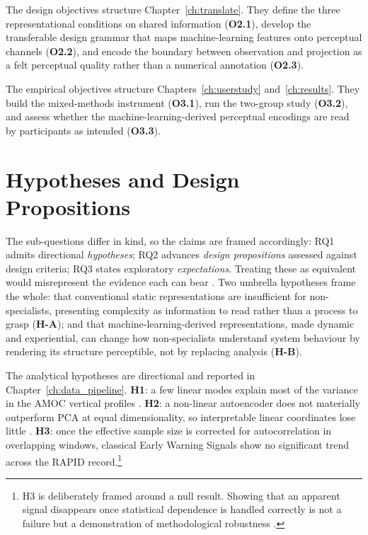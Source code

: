 The design objectives structure Chapter~\ref{ch:translate}. They define the three representational conditions on shared information (\textbf{O2.1}), develop the transferable design grammar that maps machine-learning features onto perceptual channels (\textbf{O2.2}), and encode the boundary between observation and projection as a felt perceptual quality rather than a numerical annotation (\textbf{O2.3}).

The empirical objectives structure Chapters~\ref{ch:userstudy} and~\ref{ch:results}. They build the mixed-methods instrument (\textbf{O3.1}), run the two-group study (\textbf{O3.2}), and assess whether the machine-learning-derived perceptual encodings are read by participants as intended (\textbf{O3.3}).

\section{Hypotheses and Design Propositions}
\label{sec:hypotheses}

The sub-questions differ in kind, so the claims are framed accordingly: RQ1 admits directional \emph{hypotheses}; RQ2 advances \emph{design propositions} assessed against design criteria; RQ3 states exploratory \emph{expectations}. Treating these as equivalent would misrepresent the evidence each can bear \citep{cronbach1975, mckenney2018}. Two umbrella hypotheses frame the whole: that conventional static representations are insufficient for non-specialists, presenting complexity as information to read rather than a process to grasp (\textbf{H-A}); and that machine-learning-derived representations, made dynamic and experiential, can change how non-specialists understand system behaviour by rendering its structure perceptible, not by replacing analysis (\textbf{H-B}).

The analytical hypotheses are directional and reported in Chapter~\ref{ch:data_pipeline}. \textbf{H1}: a few linear modes explain most of the variance in the AMOC vertical profiles \citep{buckley2016, hannachi2007}. \textbf{H2}: a non-linear autoencoder does not materially outperform PCA at equal dimensionality, so interpretable linear coordinates lose little \citep{baldi1989}. \textbf{H3}: once the effective sample size is corrected for autocorrelation in overlapping windows, classical Early Warning Signals show no significant trend across the RAPID record.\footnote{H3 is deliberately framed around a null result. Showing that an apparent signal disappears once statistical dependence is handled correctly is not a failure but a demonstration of methodological robustness \citep{dakos2012, scheffer2009}.}

